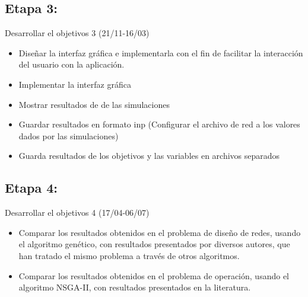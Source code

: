 \documentclass[11pt,letterpaper]{article}
\begin{document}
\subsection{Etapa 3:} Desarrollar el objetivos 3 (21/11-16/03)
\begin{itemize}
	\item Diseñar la interfaz gráfica e implementarla con el fin de facilitar la interacción del usuario con la aplicación.
	\item Implementar la interfaz gráfica
	\item Mostrar resultados de de las simulaciones
	\item Guardar resultados en formato inp (Configurar el archivo de red a los valores dados por las simulaciones)
	\item Guarda resultados de los objetivos y las variables en archivos separados
\end{itemize}

\subsection{Etapa 4:} Desarrollar el objetivos 4 (17/04-06/07)
\begin{itemize}
	\item Comparar los resultados obtenidos en el problema de diseño de redes, usando el algoritmo genético, con resultados presentados por diversos autores, que han tratado el mismo problema a través de otros algoritmos.
	\item Comparar los resultados obtenidos en el problema de operación, usando el algoritmo NSGA-II, con resultados presentados en la literatura.
\end{itemize}





\end{document}
